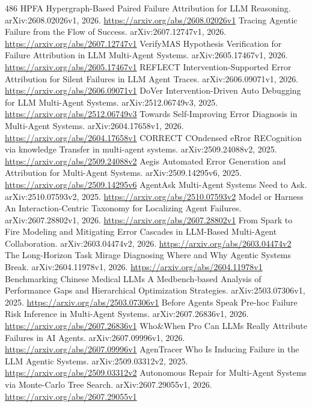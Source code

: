 \documentclass[11pt]{article}
\begin{document}
\begin{thebibliography}{486}
 HPFA Hypergraph-Based Paired Failure Attribution for LLM Reasoning. arXiv:2608.02026v1, 2026. \url{https://arxiv.org/abs/2608.02026v1}
 Tracing Agentic Failure from the Flow of Success. arXiv:2607.12747v1, 2026. \url{https://arxiv.org/abs/2607.12747v1}
 VerifyMAS Hypothesis Verification for Failure Attribution in LLM Multi-Agent Systems. arXiv:2605.17467v1, 2026. \url{https://arxiv.org/abs/2605.17467v1}
 REFLECT Intervention-Supported Error Attribution for Silent Failures in LLM Agent Traces. arXiv:2606.09071v1, 2026. \url{https://arxiv.org/abs/2606.09071v1}
 DoVer Intervention-Driven Auto Debugging for LLM Multi-Agent Systems. arXiv:2512.06749v3, 2025. \url{https://arxiv.org/abs/2512.06749v3}
 Towards Self-Improving Error Diagnosis in Multi-Agent Systems. arXiv:2604.17658v1, 2026. \url{https://arxiv.org/abs/2604.17658v1}
 CORRECT COndensed eRror RECognition via knowledge Transfer in multi-agent systems. arXiv:2509.24088v2, 2025. \url{https://arxiv.org/abs/2509.24088v2}
 Aegis Automated Error Generation and Attribution for Multi-Agent Systems. arXiv:2509.14295v6, 2025. \url{https://arxiv.org/abs/2509.14295v6}
 AgentAsk Multi-Agent Systems Need to Ask. arXiv:2510.07593v2, 2025. \url{https://arxiv.org/abs/2510.07593v2}
 Model or Harness An Interaction-Centric Taxonomy for Localizing Agent Failures. arXiv:2607.28802v1, 2026. \url{https://arxiv.org/abs/2607.28802v1}
 From Spark to Fire Modeling and Mitigating Error Cascades in LLM-Based Multi-Agent Collaboration. arXiv:2603.04474v2, 2026. \url{https://arxiv.org/abs/2603.04474v2}
 The Long-Horizon Task Mirage Diagnosing Where and Why Agentic Systems Break. arXiv:2604.11978v1, 2026. \url{https://arxiv.org/abs/2604.11978v1}
 Benchmarking Chinese Medical LLMs A Medbench-based Analysis of Performance Gaps and Hierarchical Optimization Strategies. arXiv:2503.07306v1, 2025. \url{https://arxiv.org/abs/2503.07306v1}
 Before Agents Speak Pre-hoc Failure Risk Inference in Multi-Agent Systems. arXiv:2607.26836v1, 2026. \url{https://arxiv.org/abs/2607.26836v1}
 Who\&When Pro Can LLMs Really Attribute Failures in AI Agents. arXiv:2607.09996v1, 2026. \url{https://arxiv.org/abs/2607.09996v1}
 AgenTracer Who Is Inducing Failure in the LLM Agentic Systems. arXiv:2509.03312v2, 2025. \url{https://arxiv.org/abs/2509.03312v2}
 Autonomous Repair for Multi-Agent Systems via Monte-Carlo Tree Search. arXiv:2607.29055v1, 2026. \url{https://arxiv.org/abs/2607.29055v1}

\end{thebibliography}
\end{document}
